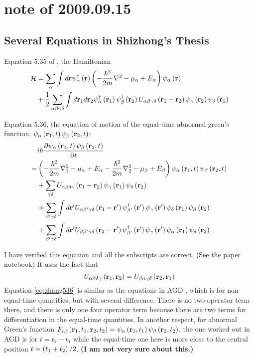\section{note of 2009.09.15}
\subsection{Several Equations in Shizhong's Thesis\label{subsec:zhangEq090915}}
Equation 5.35 of \cite{ZhangThesis}, the Hamiltonian
\begin{equation}\label{eq:zhang535}
\begin{split}
\mathcal{H}&=\sum_\alpha\int{d}\mathbf{r}\psi^\dagger_\alpha\left(\mathbf{r}\right)\left(-\frac{\hbar^2}{2m}\nabla^2-\mu_\alpha+E_\alpha\right)\psi_\alpha\left(\mathbf{r}\right)\\
&+\frac{1}{2}\sum_{\alpha\beta\gamma\delta}\int{d}\mathbf{r}_1{d}\mathbf{r}_2\psi^\dagger_\alpha\left(\mathbf{r}_1\right)\psi^\dagger_\beta\left(\mathbf{r}_2\right)U_{\alpha\beta\gamma\delta}\left(\mathbf{r}_1-\mathbf{r}_2\right)\psi_\gamma\left(\mathbf{r}_2\right)\psi_\delta\left(\mathbf{r}_1\right)
\end{split}
\end{equation}

Equation 5.36, the equation of motion of the equal-time abnormal green's function, $\psi_\alpha\left(\mathbf{r}_1,t\right)\psi_\beta\left(\mathbf{r}_2,t\right)$:
\begin{equation}\label{eq:zhang536}
\begin{split}
&i\hbar\frac{\partial{\psi_\alpha\ensuremath{\left(\mathbf{r}_1,t\right)}\psi_\beta\ensuremath{\left(\mathbf{r}_2,t\right)}}}{\partial{t}}\\
=&\left(-\frac{\hbar^2}{2m}\nabla_1^2-\mu_\alpha+E_\alpha-\frac{\hbar^2}{2m}\nabla_2^2-\mu_\beta+E_\beta\right)\psi_\alpha\left(\mathbf{r}_1,t\right)\psi_\beta\left(\mathbf{r}_2,t\right)\\
&+\sum_{\gamma\delta}U_{\alpha\beta\delta\gamma}\left(\mathbf{r}_1-\mathbf{r}_2\right)\psi_\gamma\left(\mathbf{r}_1\right)\psi_\delta\left(\mathbf{r}_2\right)\\
&+\sum_{\beta'\gamma\delta}\int{d}\mathbf{r}'U_{\alpha\beta'\gamma\delta}\left(\mathbf{r}_1-\mathbf{r}'\right)\psi^\dagger_{\beta'}\left(\mathbf{r}'\right)\psi_\gamma\left(\mathbf{r}'\right)\psi_\delta\left(\mathbf{r}_1\right)\psi_\beta\left(\mathbf{r}_2\right)\\
&+\sum_{\beta'\gamma\delta}\int{d}\mathbf{r}'U_{\beta\beta'\gamma\delta}\left(\mathbf{r}_2-\mathbf{r}'\right)\psi^\dagger_{\beta'}\left(\mathbf{r}'\right)\psi_\gamma\left(\mathbf{r}'\right)\psi_\alpha\left(\mathbf{r}_1\right)\psi_\delta\left(\mathbf{r}_2\right)
\end{split}
\end{equation}

I have verified this equation and all the subscripts are correct. (See the paper notebook) It uses the fact that 
\begin{equation}
U_{\alpha\beta\delta\gamma}\left(\mathbf{r}_1,\mathbf{r}_2\right)=U_{\beta\alpha\gamma\delta}\left(\mathbf{r}_2,\mathbf{r}_1\right)
\end{equation}
Equation \eqref{eq:zhang536} is similar as the equations in AGD \cite{Abrikosov}, which is for non-equal-time quantities, but with several difference.  There is no two-operator term there, and there is only one four operator term because there are two terms for differentiation in the equal-time quantities. In another respect, for abnormal Green's function $F_{\alpha\beta}(\mathbf{r}_1,t_1,\mathbf{r}_2,t_2)=\psi_\alpha\left(\mathbf{r}_1,t_1\right)\psi_\beta\left(\mathbf{r}_2,t_2\right)$,  the one worked out in AGD is for $t=t_2-t_1$ while  the equal-time one here is more close to the central position $t=\left(t_1+t_2\right)/2$. \textbf{(I am not very sure about this.)}

